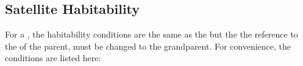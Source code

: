 \documentclass[letterpaper,10pt,english]{sphinxmanual}
\begin{document}
\subsection{Satellite Habitability}
\label{\detokenize{quantities/habitability/satellite_habitability:satellite-habitability}}\label{\detokenize{quantities/habitability/satellite_habitability::doc}}\label{\detokenize{quantities/habitability/satellite_habitability:id1}}
\sphinxAtStartPar
For a {\hyperref[\detokenize{celestial_bodies/satellite:id1}]{}}, the habitability conditions are the same as the
{\hyperref[\detokenize{quantities/habitability/planet_habitability:id1}]{}}
but the the reference to the {\hyperref[\detokenize{quantities/habitability/habitable_zones/habitable_zones:id1}]{}} of the parent, must be changed to the grandparent.
For convenience, the conditions are listed here:
\end{document}

